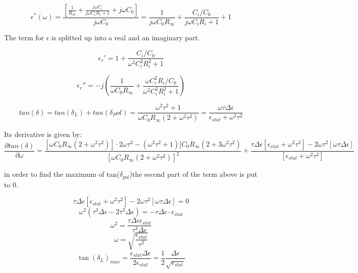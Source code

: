 \begin{equation}
\epsilon^*(\omega)= \frac{[\frac{1}{R_\infty}+\frac{j \omega C_i}{j\omega C_i R_i  +1}+j \omega C_0]}{j \omega C_0} = \frac{1}{j \omega C_0 R_\infty}+ \frac{C_i/C_0}{j\omega C_i R_i  +1}+1
\end{equation}

The term for $\epsilon$ is splitted up into a real and an imaginary part. 

\begin{equation}
\epsilon_r' = 1+ \frac{C_i/C_0}{\omega^2 C_i^2 R_i^2 +1}
\end{equation}

\begin{equation}
\epsilon_r'' = -j \left(\frac{1}{\omega C_0 R_\infty}+\frac{\omega C_i^2 R_i / C_0}{\omega^2 C_i^2 R_i^2 +1} \right)
\end{equation}

\begin{equation}
tan(\delta) = tan(\delta_L) + tan( \delta_Pol) = \frac{\omega^2 \tau^2+1}{\omega C_0 R_\infty (2+ \omega^2 \tau^2)}=\frac{\omega \tau \Delta \epsilon}{\epsilon_{stat} + \omega^2 \tau^2}
\end{equation}

Its derivative is given by: 
\begin{equation}
\frac{\partial tan(\delta)}{ \partial \omega} = \frac{[\omega C_0 R_\infty (2+\omega^2 \tau^2)]\cdot 2 \omega \tau^2 - (\omega^2 \tau^2 +1) [C_0 R_\infty (2+3 \omega^2 \tau^2)  }{[\omega C_0 R_\infty (2+\omega^2 \tau^2)]^2}+ \frac{\tau \Delta \epsilon [\epsilon_{stat} + \omega^2 \tau^2] - 2 \omega \tau^2 [\omega \tau \Delta \epsilon]}{[\epsilon_{stat} +\omega^2 \tau^2]}
\end{equation}

in order to find the maximum of tan($\delta_{pol}$)the second part of the term above is put to 0. 

\begin{equation}
\tau \Delta \epsilon [\epsilon_{stat} + \omega^2 \tau^2] -2\omega \tau^2 [\omega \tau \Delta \epsilon] = 0
\end{equation}
\begin{equation}
\omega^2 (\tau^3 \Delta \epsilon -2 \tau^3 \Delta \epsilon) = - \tau \Delta \epsilon \cdot \epsilon_{stat}
\end{equation}
\begin{equation}
\omega^2 = \frac{\tau \Delta \epsilon \epsilon_{stat}}{\tau^3 \Delta \epsilon}
\end{equation}
\begin{equation}
\omega = \sqrt{\frac{\epsilon_{stat}}{\tau^2}}
\end{equation}
\begin{equation}
\tan(\delta_L)_{max} = \frac{\epsilon_{stat} \Delta\epsilon}{2\epsilon_{stat}} = \frac{1}{2} \frac{\Delta \epsilon}{\sqrt{\epsilon_{stat}}}
\end{equation}


